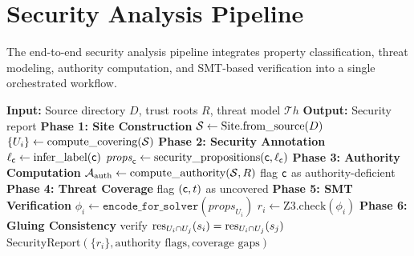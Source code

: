\documentclass[11pt]{article}
\newcommand{\EncodeForSolver}{\texttt{encode\_for\_solver}}
\newcommand{\AuthLevel}{\mathsf{auth}}
\newcommand{\AuthSheaf}{\mathcal{A}_{\mathrm{auth}}}
\begin{document}
\section{Security Analysis Pipeline}\label{sec:pipeline}

The end-to-end security analysis pipeline integrates property
classification, threat modeling, authority computation, and SMT-based
verification into a single orchestrated workflow.

\begin{algorithm}[H]
\caption{End-to-End Security Analysis Pipeline}
\label{alg:pipeline}
\begin{algorithmic}[1]
\STATE \textbf{Input:} Source directory $D$, trust roots $R$,
  threat model $\mathcal{T}\!h$
\STATE \textbf{Output:} Security report
\STATE \textbf{Phase 1: Site Construction}
\STATE $\mathcal{S} \gets \text{Site.from\_source}(D)$
\STATE $\{U_i\} \gets \text{compute\_covering}(\mathcal{S})$
\STATE \textbf{Phase 2: Security Annotation}
  \STATE $\ell_{\mathsf{c}} \gets \text{infer\_label}(\mathsf{c})$
  \STATE $\mathit{props}_{\mathsf{c}} \gets
    \text{security\_propositions}(\mathsf{c}, \ell_{\mathsf{c}})$
\ENDFOR
\STATE \textbf{Phase 3: Authority Computation}
\STATE $\AuthSheaf \gets \text{compute\_authority}(\Site, R)$
  \IF{$\AuthSheaf(\coord) < \AuthLevel_{\min}(\coord)$}
    \STATE flag $\mathsf{c}$ as authority-deficient
  \ENDIF
\ENDFOR
\STATE \textbf{Phase 4: Threat Coverage}
      \STATE flag $(\mathsf{c}, t)$ as uncovered
    \ENDIF
  \ENDFOR
\ENDFOR
\STATE \textbf{Phase 5: SMT Verification}
  \STATE $\phi_i \gets \EncodeForSolver(\mathit{props}_{U_i})$
  \STATE $r_i \gets \text{Z3.check}(\phi_i)$
\ENDFOR
\STATE \textbf{Phase 6: Gluing Consistency}
  \STATE verify $\mathrm{res}_{U_i \cap U_j}(s_i) =
    \mathrm{res}_{U_i \cap U_j}(s_j)$
\ENDFOR
\RETURN $\text{SecurityReport}(\{r_i\},
  \text{authority flags}, \text{coverage gaps})$
\end{algorithmic}
\end{algorithm}
\end{document}

